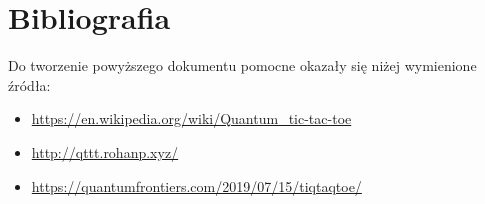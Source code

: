 \documentclass{article}
\begin{document}
\newpage

\section{Bibliografia}
Do tworzenie powyższego dokumentu pomocne okazały się niżej wymienione źródła:

\begin{itemize}
    \item \url{https://en.wikipedia.org/wiki/Quantum\_tic-tac-toe}
    \item \url{http://qttt.rohanp.xyz/}
    \item \url{https://quantumfrontiers.com/2019/07/15/tiqtaqtoe/}
\end{itemize}
\end{document}
